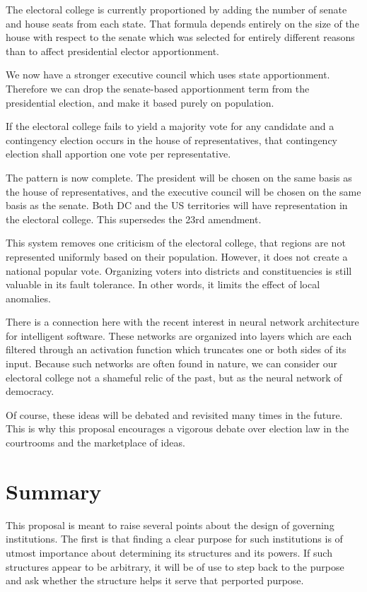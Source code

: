 \documentclass{article}
\begin{document}
The electoral college is currently proportioned by adding the number of senate and house seats from each state. That formula depends entirely on the size of the house with respect to the senate which was selected for entirely different reasons than to affect presidential elector apportionment.

We now have a stronger executive council which uses state apportionment. Therefore we can drop the senate-based apportionment term from the presidential election, and make it based purely on population.

\begin{quoting}
If the electoral college fails to yield a majority vote for any candidate and a contingency election occurs in the house of representatives, that contingency election shall apportion one vote per representative.
\end{quoting}

The pattern is now complete. The president will be chosen on the same basis as the house of representatives, and the executive council will be chosen on the same basis as the senate. Both DC and the US territories will have representation in the electoral college. This supersedes the 23rd amendment.

This system removes one criticism of the electoral college, that regions are not represented uniformly based on their population. However, it does not create a national popular vote. Organizing voters into districts and constituencies is still valuable in its fault tolerance. In other words, it limits the effect of local anomalies.

There is a connection here with the recent interest in neural network architecture for intelligent software. These networks are organized into layers which are each filtered through an activation function which truncates one or both sides of its input. Because such networks are often found in nature, we can consider our electoral college not a shameful relic of the past, but as the neural network of democracy.

Of course, these ideas will be debated and revisited many times in the future. This is why this proposal encourages a vigorous debate over election law in the courtrooms and the marketplace of ideas.

\section{Summary}

This proposal is meant to raise several points about the design of governing institutions. The first is that finding a clear purpose for such institutions is of utmost importance about determining its structures and its powers. If such structures appear to be arbitrary, it will be of use to step back to the purpose and ask whether the structure helps it serve that perported purpose.
\end{document}
